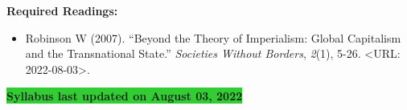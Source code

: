 \documentclass[11pt,]{article}
\providecommand{\tightlist}{%
  \setlength{\itemsep}{0pt}\setlength{\parskip}{0pt}}
\begin{document}
\textbf{Required Readings:}

\begin{itemize}
\tightlist
\item
  Robinson W (2007). ``Beyond the Theory of Imperialism: Global
  Capitalism and the Transnational State.'' \emph{Societies Without
  Borders}, \emph{2}(1), 5-26. \textless URL: 2022-08-03\textgreater.
\end{itemize}

\textbf{\colorbox{LimeGreen}{Syllabus last updated on August 03, 2022 }}
\end{document}

